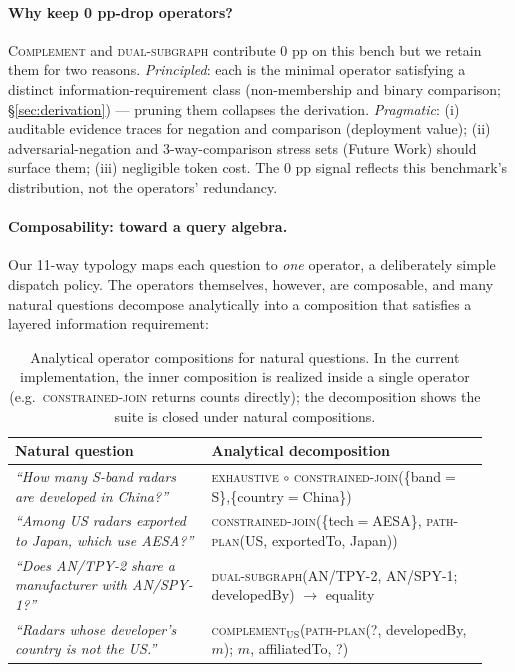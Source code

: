 \documentclass[10pt,a4paper,twocolumn]{article}
\newcommand{\op}[1]{\textsc{\small #1}}
\begin{document}
\paragraph{Why keep 0 pp-drop operators?}
\op{Complement} and \op{dual-subgraph} contribute 0 pp on this bench but we retain them for two reasons. \emph{Principled}: each is the minimal operator satisfying a distinct information-requirement class (non-membership and binary comparison; §\ref{sec:derivation}) --- pruning them collapses the derivation. \emph{Pragmatic}: (i) auditable evidence traces for negation and comparison (deployment value); (ii) adversarial-negation and 3-way-comparison stress sets (Future Work) should surface them; (iii) negligible token cost. The 0 pp signal reflects this benchmark's distribution, not the operators' redundancy.

\paragraph{Composability: toward a query algebra.}
Our 11-way typology maps each question to \emph{one} operator, a deliberately simple dispatch policy. The operators themselves, however, are composable, and many natural questions decompose analytically into a composition that satisfies a layered information requirement:

\begin{table}[h]
\centering
\small
\caption{Analytical operator compositions for natural questions. In the current implementation, the inner composition is realized inside a single operator (e.g.\ \op{constrained-join} returns counts directly); the decomposition shows the suite is closed under natural compositions.}
\label{tab:composability}
\begin{tabular}{p{0.39\linewidth} p{0.55\linewidth}}
\toprule
\textbf{Natural question} & \textbf{Analytical decomposition} \\
\midrule
\emph{``How many S-band radars are developed in China?''} & \op{exhaustive} $\circ$ \op{constrained-join}(\{band$\!=\!$S\},\{country$\!=\!$China\}) \\
\emph{``Among US radars exported to Japan, which use AESA?''} & \op{constrained-join}(\{tech$\!=\!$AESA\}, \op{path-plan}(US, exportedTo, Japan)) \\
\emph{``Does AN/TPY-2 share a manufacturer with AN/SPY-1?''} & \op{dual-subgraph}(AN/TPY-2, AN/SPY-1; developedBy) $\to$ equality \\
\emph{``Radars whose developer's country is not the US.''} & \op{complement}$_{\text{US}}$(\op{path-plan}(?, developedBy, $m$); $m$, affiliatedTo, ?) \\
\bottomrule
\end{tabular}
\end{table}
\end{document}

